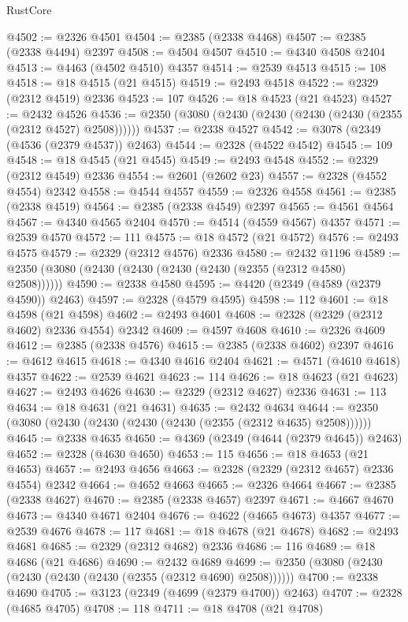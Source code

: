 \begin{lexlean}{RustCore}
\begin{coremodule}
@4502 := @2326 @4501
@4504 := @2385 (@2338 @4468)
@4507 := @2385 (@2338 @4494) @2397
@4508 := @4504 @4507
@4510 := @4340 @4508 @2404
@4513 := @4463 (@4502 @4510) @4357
@4514 := @2539 @4513
@4515 := 108
@4518 := @18 @4515 (@21 @4515)
@4519 := @2493 @4518
@4522 := @2329 (@2312 @4519) @2336
@4523 := 107
@4526 := @18 @4523 (@21 @4523)
@4527 := @2432 @4526
@4536 := @2350 (@3080 (@2430 (@2430 (@2430 (@2430 (@2355 (@2312 @4527) @2508))))))
@4537 := @2338 @4527
@4542 := @3078 (@2349 (@4536 (@2379 @4537)) @2463)
@4544 := @2328 (@4522 @4542)
@4545 := 109
@4548 := @18 @4545 (@21 @4545)
@4549 := @2493 @4548
@4552 := @2329 (@2312 @4549) @2336
@4554 := @2601 (@2602 @23)
@4557 := @2328 (@4552 @4554) @2342
@4558 := @4544 @4557
@4559 := @2326 @4558
@4561 := @2385 (@2338 @4519)
@4564 := @2385 (@2338 @4549) @2397
@4565 := @4561 @4564
@4567 := @4340 @4565 @2404
@4570 := @4514 (@4559 @4567) @4357
@4571 := @2539 @4570
@4572 := 111
@4575 := @18 @4572 (@21 @4572)
@4576 := @2493 @4575
@4579 := @2329 (@2312 @4576) @2336
@4580 := @2432 @1196
@4589 := @2350 (@3080 (@2430 (@2430 (@2430 (@2430 (@2355 (@2312 @4580) @2508))))))
@4590 := @2338 @4580
@4595 := @4420 (@2349 (@4589 (@2379 @4590)) @2463)
@4597 := @2328 (@4579 @4595)
@4598 := 112
@4601 := @18 @4598 (@21 @4598)
@4602 := @2493 @4601
@4608 := @2328 (@2329 (@2312 @4602) @2336 @4554) @2342
@4609 := @4597 @4608
@4610 := @2326 @4609
@4612 := @2385 (@2338 @4576)
@4615 := @2385 (@2338 @4602) @2397
@4616 := @4612 @4615
@4618 := @4340 @4616 @2404
@4621 := @4571 (@4610 @4618) @4357
@4622 := @2539 @4621
@4623 := 114
@4626 := @18 @4623 (@21 @4623)
@4627 := @2493 @4626
@4630 := @2329 (@2312 @4627) @2336
@4631 := 113
@4634 := @18 @4631 (@21 @4631)
@4635 := @2432 @4634
@4644 := @2350 (@3080 (@2430 (@2430 (@2430 (@2430 (@2355 (@2312 @4635) @2508))))))
@4645 := @2338 @4635
@4650 := @4369 (@2349 (@4644 (@2379 @4645)) @2463)
@4652 := @2328 (@4630 @4650)
@4653 := 115
@4656 := @18 @4653 (@21 @4653)
@4657 := @2493 @4656
@4663 := @2328 (@2329 (@2312 @4657) @2336 @4554) @2342
@4664 := @4652 @4663
@4665 := @2326 @4664
@4667 := @2385 (@2338 @4627)
@4670 := @2385 (@2338 @4657) @2397
@4671 := @4667 @4670
@4673 := @4340 @4671 @2404
@4676 := @4622 (@4665 @4673) @4357
@4677 := @2539 @4676
@4678 := 117
@4681 := @18 @4678 (@21 @4678)
@4682 := @2493 @4681
@4685 := @2329 (@2312 @4682) @2336
@4686 := 116
@4689 := @18 @4686 (@21 @4686)
@4690 := @2432 @4689
@4699 := @2350 (@3080 (@2430 (@2430 (@2430 (@2430 (@2355 (@2312 @4690) @2508))))))
@4700 := @2338 @4690
@4705 := @3123 (@2349 (@4699 (@2379 @4700)) @2463)
@4707 := @2328 (@4685 @4705)
@4708 := 118
@4711 := @18 @4708 (@21 @4708)

\end{coremodule}
\end{lexlean}
